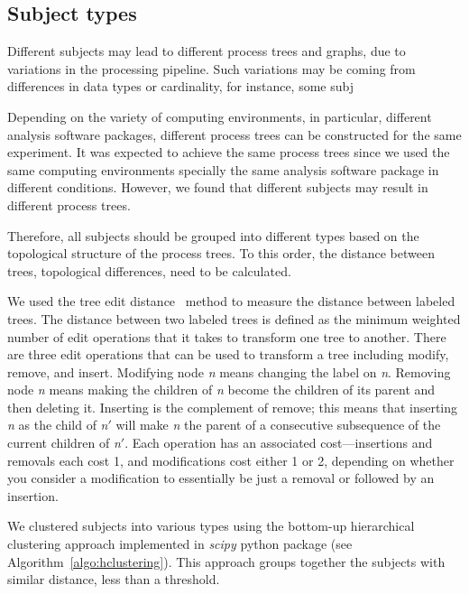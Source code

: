 \documentclass[a4paper,num-refs]{oup-contemporary}
\begin{document}
\subsection{Subject types}

Different subjects may lead to different process trees and graphs, due to
variations in the processing pipeline. Such variations may be coming from differences
in data types or cardinality, for instance, some subj 


Depending on the variety of computing environments, in particular, 
different analysis software packages, different process trees can be 
constructed for the same experiment. It was expected to achieve the 
same process trees since we used the same computing environments 
specially the same analysis software package in different conditions. 
However, we found that different subjects may result in different 
process trees. 

Therefore, all subjects should be grouped into different types based on 
the topological structure of the process trees.
To this order, the distance between trees, topological differences, 
need to be calculated.

We used the tree edit distance~\cite{zhang1989simple} method to measure 
the distance between labeled trees. The distance between two labeled 
trees is defined as the minimum weighted number of edit operations that 
it takes to transform one tree to another. There are three edit 
operations that can be used to transform a tree including modify, 
remove, and insert. Modifying node \textit{n} means changing the label 
on \textit{n}. Removing node \textit{n} means making the children of 
\textit{n} become the children of its parent and then 
deleting it. Inserting is the complement of remove; this 
means that inserting \textit{n} as the child of \textit{n}$'$ will make 
\textit{n} the parent of a consecutive subsequence of the current 
children of \textit{n}$'$.
Each operation has an associated cost---insertions and removals each 
cost 1, and modifications cost either 1 or 2, depending on whether 
you consider a modification to essentially be just a removal 
or followed by an insertion.

We clustered subjects into various types using the bottom-up hierarchical 
clustering approach implemented in \textit{scipy} python package (see 
Algorithm~\ref{algo:hclustering}). This approach groups together the 
subjects with similar distance, less than a threshold. 

  
\end{document}
